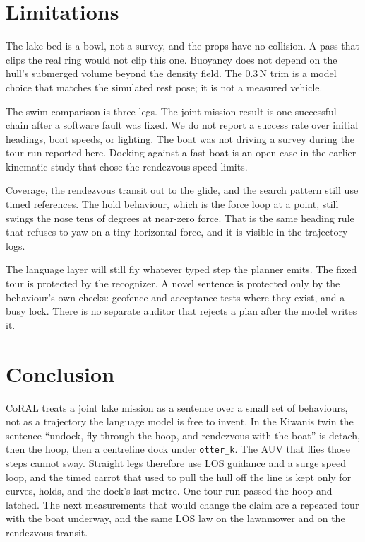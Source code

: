 \documentclass[conference]{IEEEtran}
\def\CoRAL{CoRAL}
\def\otterk{\texttt{otter\_k}}
\begin{document}
\section{Limitations}
\label{sec:limits}

The lake bed is a bowl, not a survey, and the props have no collision. A pass that clips the real ring would not clip this one. Buoyancy does not depend on the hull's submerged volume beyond the density field. The 0.3\,N trim is a model choice that matches the simulated rest pose; it is not a measured vehicle.

The swim comparison is three legs. The joint mission result is one successful chain after a software fault was fixed. We do not report a success rate over initial headings, boat speeds, or lighting. The boat was not driving a survey during the tour run reported here. Docking against a fast boat is an open case in the earlier kinematic study that chose the rendezvous speed limits.

Coverage, the rendezvous transit out to the glide, and the search pattern still use timed references. The hold behaviour, which is the force loop at a point, still swings the nose tens of degrees at near-zero force. That is the same heading rule that refuses to yaw on a tiny horizontal force, and it is visible in the trajectory logs.

The language layer will still fly whatever typed step the planner emits. The fixed tour is protected by the recognizer. A novel sentence is protected only by the behaviour's own checks: geofence and acceptance tests where they exist, and a busy lock. There is no separate auditor that rejects a plan after the model writes it.

\section{Conclusion}
\label{sec:conclusion}

\CoRAL{} treats a joint lake mission as a sentence over a small set of behaviours, not as a trajectory the language model is free to invent. In the Kiwanis twin the sentence ``undock, fly through the hoop, and rendezvous with the boat'' is detach, then the hoop, then a centreline dock under \otterk{}. The AUV that flies those steps cannot sway. Straight legs therefore use LOS guidance and a surge speed loop, and the timed carrot that used to pull the hull off the line is kept only for curves, holds, and the dock's last metre. One tour run passed the hoop and latched. The next measurements that would change the claim are a repeated tour with the boat underway, and the same LOS law on the lawnmower and on the rendezvous transit.
\end{document}

